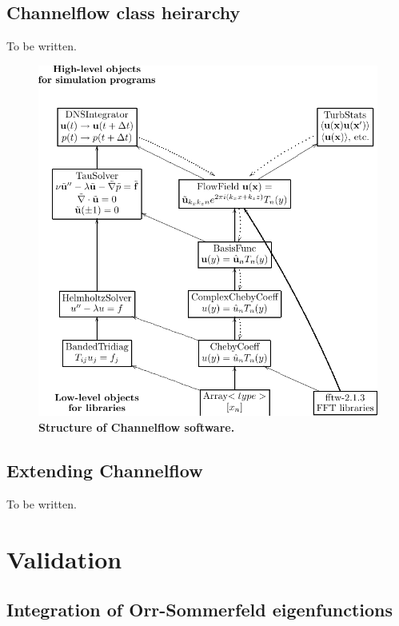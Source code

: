 \documentclass{article}[12pt]
\begin{document}
\subsection{Channelflow class heirarchy}
\label{sec:heirarchy}
To be written.
\begin{figure}
\begin{center}
\includegraphics[width=6.0in]{cfstructure}
\end{center}
\caption{{\bf Structure of Channelflow software.}}
\label{fig:cfstructure}
\end{figure}


\subsection{Extending Channelflow}
\label{sec:extensions}
To be written.

\section{Validation}

\subsection{Integration of Orr-Sommerfeld eigenfunctions}
\end{document}
